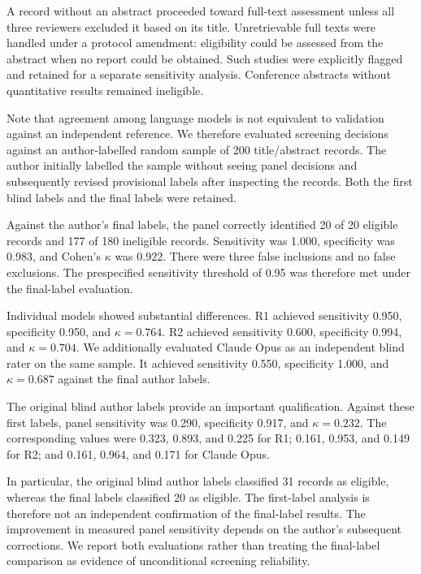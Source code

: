 A record without an abstract proceeded toward full-text assessment
unless all three reviewers excluded it based on its title.
Unretrievable full texts were handled under a protocol amendment:
eligibility could be assessed from the abstract when no report
could be obtained. Such studies were explicitly flagged and
retained for a separate sensitivity analysis. Conference abstracts
without quantitative results remained ineligible.

Note that agreement among language models is not equivalent to
validation against an independent reference. We therefore evaluated
screening decisions against an author-labelled random sample of
200 title/abstract records. The author initially labelled the
sample without seeing panel decisions and subsequently revised
provisional labels after inspecting the records. Both the first
blind labels and the final labels were retained.

Against the author's final labels, the panel correctly identified
20 of 20 eligible records and 177 of 180 ineligible records.
Sensitivity was 1.000, specificity was 0.983, and Cohen's
$\kappa$ was 0.922. There were three false inclusions and no
false exclusions. The prespecified sensitivity threshold of
0.95 was therefore met under the final-label evaluation.

Individual models showed substantial differences.
R1 achieved sensitivity 0.950, specificity 0.950, and
$\kappa=0.764$. R2 achieved sensitivity 0.600,
specificity 0.994, and $\kappa=0.704$.
We additionally evaluated Claude Opus as an independent blind
rater on the same sample. It achieved sensitivity 0.550,
specificity 1.000, and $\kappa=0.687$ against the final
author labels.

The original blind author labels provide an important
qualification. Against these first labels, panel sensitivity
was 0.290, specificity 0.917, and $\kappa=0.232$.
The corresponding values were 0.323, 0.893, and 0.225
for R1; 0.161, 0.953, and 0.149 for R2; and
0.161, 0.964, and 0.171 for Claude Opus.

In particular, the original blind author labels classified
31 records as eligible, whereas the final labels classified
20 as eligible. The first-label analysis is therefore not an
independent confirmation of the final-label results.
The improvement in measured panel sensitivity depends on the
author's subsequent corrections. We report both evaluations
rather than treating the final-label comparison as evidence of
unconditional screening reliability.

